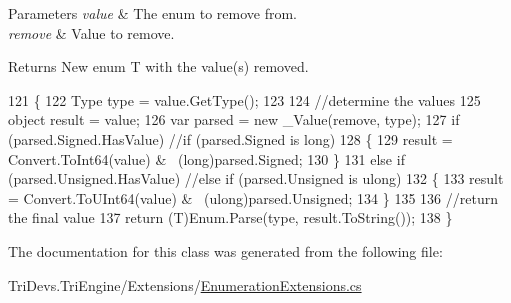 \begin{DoxyParams}{Parameters}
{\em value} & The enum to remove from.\\
\hline
{\em remove} & Value to remove.\\
\hline
\end{DoxyParams}
\begin{DoxyReturn}{Returns}
New enum T with the value(s) removed.
\end{DoxyReturn}

\begin{DoxyCode}
121         \{
122             Type type = value.GetType();
123 
124             \textcolor{comment}{//determine the values}
125             \textcolor{keywordtype}{object} result = value;
126             var parsed = \textcolor{keyword}{new} \_Value(\textcolor{keyword}{remove}, type);
127             \textcolor{keywordflow}{if} (parsed.Signed.HasValue) \textcolor{comment}{//if (parsed.Signed is long)}
128             \{
129                 result = Convert.ToInt64(value) & ~(long)parsed.Signed;
130             \}
131             \textcolor{keywordflow}{else} \textcolor{keywordflow}{if} (parsed.Unsigned.HasValue) \textcolor{comment}{//else if (parsed.Unsigned is ulong)}
132             \{
133                 result = Convert.ToUInt64(value) & ~(ulong)parsed.Unsigned;
134             \}
135 
136             \textcolor{comment}{//return the final value}
137             \textcolor{keywordflow}{return} (T)Enum.Parse(type, result.ToString());
138         \}
\end{DoxyCode}


The documentation for this class was generated from the following file\-:\begin{DoxyCompactItemize}
\item 
Tri\-Devs.\-Tri\-Engine/\-Extensions/\hyperlink{_enumeration_extensions_8cs}{Enumeration\-Extensions.\-cs}\end{DoxyCompactItemize}
